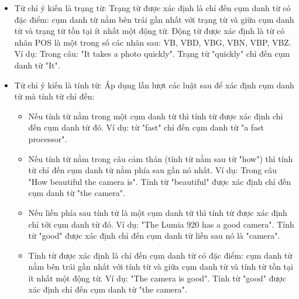 \documentclass[12pt]{extarticle}
\begin{document}
				\begin{itemize}
					\item{Từ chỉ ý kiến là trạng từ:
					Trạng từ được xác định là chỉ đến cụm danh từ có đặc điểm: cụm danh từ nằm bên trái gần nhất với trạng từ và giữa cụm danh từ và trạng từ tồn tại ít nhất một động từ. Động từ được xác định là từ có nhãn POS là một trong số các nhãn sau: VB, VBD, VBG, VBN, VBP, VBZ. Ví dụ: Trong câu: "It takes a photo quickly". Trạng từ "quickly" chỉ đến cụm danh từ "It".}
					\item{Từ chỉ ý kiến là tính từ: 
					Áp dụng lần lượt các luật sau để xác định cụm danh từ mà tính từ chỉ đến:
						\begin{itemize}
							\item{Nếu tính từ nằm trong một cụm danh từ thì tính từ được xác định chỉ đến cụm danh từ đó. Ví dụ: từ "fast" chỉ đến cụm danh từ "a fast processor".}
							\item{Nếu tính từ nằm trong câu cảm thán (tính từ nằm sau từ "how") thì tính từ chỉ đến cụm danh từ nằm phía sau gần nó nhất. Ví dụ: Trong câu "How beautiful the camera is". Tính từ "beautiful" được xác định chỉ đến cụm danh từ "the camera".}
							\item{Nếu liền phía sau tính từ là một cụm danh từ thì tính từ được xác định chỉ tới cụm danh từ đó. Ví dụ: "The Lumia 920 has a good camera". Tính từ "good" được xác định chỉ đến cụm danh từ liền sau nó là "camera".}
							\item{Tính từ được xác định là chỉ đến cụm danh từ có đặc điểm: cụm danh từ nằm bên trái gần nhất với tính từ và giữa cụm danh từ và tính từ tồn tại ít nhất một động từ. Ví dụ: "The camera is good". Tính từ "good" được xác định chỉ đến cụm danh từ "the camera".}
						\end{itemize}}
				\end{itemize}
\end{document}
